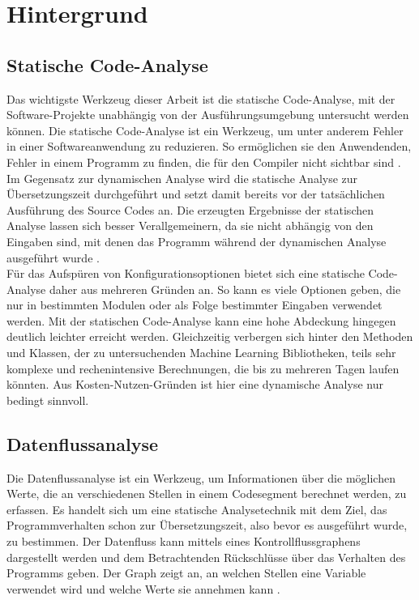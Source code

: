 \documentclass[german,bachelor]{swsLeipzig}
\begin{document}
\chapter{Hintergrund}\label{Hintergrund}

\section{Statische Code-Analyse}
Das wichtigste Werkzeug dieser Arbeit ist die statische Code-Analyse,
mit der Software-Projekte unabhängig von der Ausführungsumgebung untersucht werden können.
Die statische Code-Analyse ist ein Werkzeug, um unter anderem Fehler in einer Softwareanwendung zu reduzieren.
So ermöglichen sie den Anwendenden, Fehler in einem Programm zu finden, die für den Compiler nicht sichtbar sind \cite[]{bardas2010static}.\\

Im Gegensatz zur dynamischen Analyse wird die statische Analyse zur Übersetzungszeit durchgeführt
und setzt damit bereits vor der tatsächlichen Ausführung des Source Codes an.
Die erzeugten Ergebnisse der statischen Analyse lassen sich besser Verallgemeinern, da sie nicht abhängig von den Eingaben sind,
mit denen das Programm während der dynamischen Analyse ausgeführt wurde \cite[]{gomes2009overview}.\\

Für das Aufspüren von Konfigurationsoptionen bietet sich eine statische Code-Analyse daher aus mehreren Gründen an.
So kann es viele Optionen geben, die nur in bestimmten Modulen oder als Folge bestimmter Eingaben verwendet werden.
Mit der statischen Code-Analyse kann eine hohe Abdeckung hingegen deutlich leichter erreicht werden.
Gleichzeitig verbergen sich hinter den Methoden und Klassen, der zu untersuchenden Machine Learning Bibliotheken,
teils sehr komplexe und rechenintensive Berechnungen, die bis zu mehreren Tagen laufen könnten.
Aus Kosten-Nutzen-Gründen ist hier eine dynamische Analyse nur bedingt sinnvoll.\\

\section{Datenflussanalyse}
Die Datenflussanalyse ist ein Werkzeug, um Informationen über die möglichen Werte, die an verschiedenen
Stellen in einem Codesegment berechnet werden, zu erfassen.
Es handelt sich um eine statische Analysetechnik mit dem Ziel, das Programmverhalten schon zur Übersetzungszeit,
also bevor es ausgeführt wurde, zu bestimmen.
Der Datenfluss kann mittels eines Kontrollflussgraphens dargestellt werden und dem Betrachtenden
Rückschlüsse über das Verhalten des Programms geben.
Der Graph zeigt an, an welchen Stellen eine Variable verwendet wird und welche Werte sie annehmen kann \cite[]{58766}.\\
\end{document}
